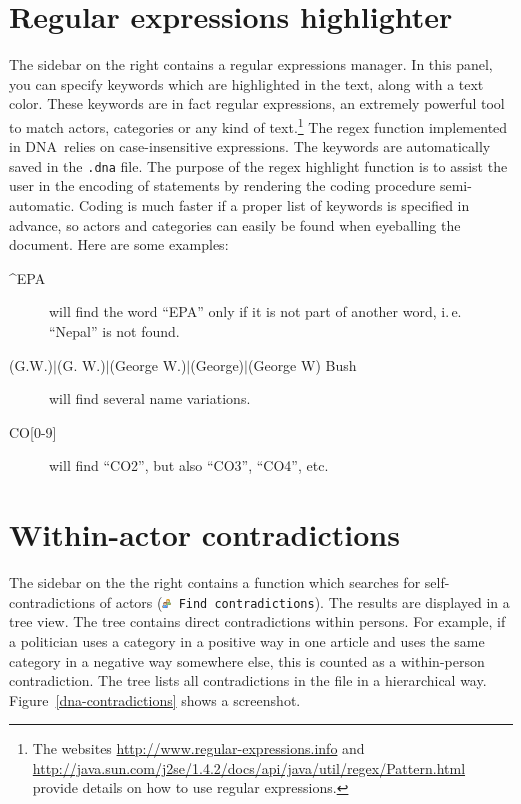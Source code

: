 \documentclass[12pt,a4paper]{scrreprt}
\newcommand{\dnashort}{\textsc{DNA}}
\newcommand{\code}[1]{\texttt{#1}}
\begin{document}
\section{Regular expressions highlighter}\label{regex}
The sidebar on the right contains a regular expressions manager. In this panel, you can specify keywords which are highlighted in the text, along with a text color. These keywords are in fact regular expressions, an extremely powerful tool to match actors, categories or any kind of text.\footnote{The websites \url{http://www.regular-expressions.info} and \url{http://java.sun.com/j2se/1.4.2/docs/api/java/util/regex/Pattern.html} provide details on how to use regular expressions.} The regex function implemented in \dnashort\ relies on case-insensitive expressions. The keywords are automatically saved in the  \code{.dna} file. The purpose of the regex highlight function is to assist the user in the encoding of statements by rendering the coding procedure semi-automatic. Coding is much faster if a proper list of keywords is specified in advance, so actors and categories can easily be found when eyeballing the document. Here are some examples:
\begin{description}
 \item[\textasciicircum EPA\textdollar] will find the word ``EPA'' only if it is not part of another word, i.\,e. ``Nepal'' is not found.
 \item[(G.W.)$|$(G. W.)$|$(George W.)$|$(George)$|$(George W) Bush] will find several name va\-ri\-a\-tions.
 \item[CO[0-9{]}] will find ``CO2'', but also ``CO3'', ``CO4'', etc.
\end{description}

\section{Within-actor contradictions}
The sidebar on the the right contains a function which searches for self-contradictions of actors (\code{\includegraphics[height=9px]{icons-group.png} Find contradictions}). The results are displayed in a tree view. The tree contains direct contradictions within persons. For example, if a politician uses a category in a positive way in one article and uses the same category in a negative way somewhere else, this is counted as a within-person contradiction. The tree lists all contradictions in the file in a hierarchical way. Figure~\ref{dna-contradictions} shows a screenshot.
\end{document}
